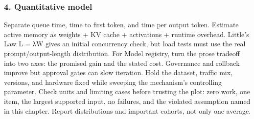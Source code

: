 \subsubsection*{4. Quantitative model}
Separate queue time, time to first token, and time per output token. Estimate active memory as weights + KV cache + activations + runtime overhead. Little's Law L = λW gives an initial concurrency check, but load tests must use the real prompt/output-length distribution.
For Model registry, turn the prose tradeoff into two axes: the promised gain and the stated cost. Governance and rollback improve but approval gates can slow iteration. Hold the dataset, traffic mix, versions, and hardware fixed while sweeping the mechanism's controlling parameter.
Check units and limiting cases before trusting the plot: zero work, one item, the largest supported input, no failures, and the violated assumption named in this chapter. Report distributions and important cohorts, not only one average.
